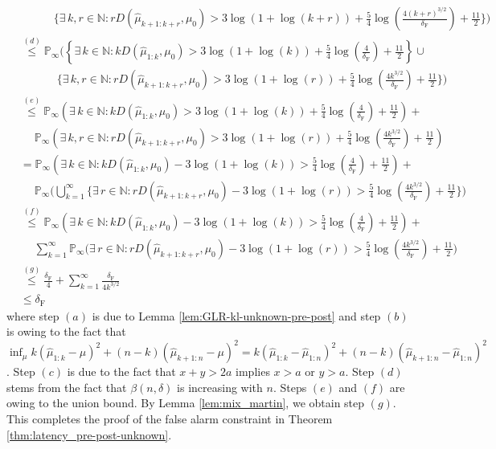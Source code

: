 \documentclass[12pt]{interact}
\newcommand{\lp}{\left(}
\newcommand{\rp}{\right)}
\newcommand{\mrm}{\mathrm}
\newcommand{\mbb}{\mathbb}
\renewcommand{\Pr}{\mathbb{P}}
\theoremstyle{plain}
\begin{document}
\begin{align}
    &\quad\quad\quad\Bigg\{\exists\,k,r\in\mathbb{N}:r D (\hat{\mu}_{k+1:k+r},\mu_{0})>3\log(1+\log(k+r))+\frac{5}{4}\log\lp\frac{4\lp k+r\rp^{3/2}}{\delta_{\mrm{F}}}\rp+\frac{11}{2}\Bigg\}\Bigg)\\\nonumber
    &\overset{(d)}{\leq}\Pr_{\infty}\bigg(\left\{\exists\,k\in\mathbb{N}:k D (\hat{\mu}_{1:k},\mu_{0})>3\log(1+\log(k))+\frac{5}{4}\log\lp\frac{4}{\delta_{\mrm{F}}}\rp+\frac{11}{2}\right\}\cup\\\nonumber
    &\quad\quad\quad\;\bigg\{\exists\,k,r\in\mathbb{N}:r D (\hat{\mu}_{k+1:k+r},\mu_{0})>3\log(1+\log(r))+\frac{5}{4}\log\lp\frac{4k^{3/2}}{\delta_{\mrm{F}}}\rp+\frac{11}{2}\bigg\}\bigg) \\\nonumber
    &\overset{(e)}{\leq}\Pr_{\infty}\left(\exists\,k\in\mathbb{N}:k D (\hat{\mu}_{1:k},\mu_{0})>3\log(1+\log(k))+\frac{5}{4}\log\lp\frac{4}{\delta_{\mrm{F}}}\rp+\frac{11}{2}\right)+\\\nonumber
    &\quad\;\Pr_{\infty}\left(\exists\,k,r\in\mathbb{N}:r D (\hat{\mu}_{k+1:k+r},\mu_{0})>3\log(1+\log(r))+\frac{5}{4}\log\lp\frac{4k^{3/2}}{\delta_{\mrm{F}}}\rp+\frac{11}{2}\right)\\\nonumber
    &=\Pr_{\infty}\left(\exists\,k\in\mathbb{N}:k D (\hat{\mu}_{1:k},\mu_{0})-3\log(1+\log(k))>\frac{5}{4}\log\lp\frac{4}{\delta_{\mrm{F}}}\rp+\frac{11}{2}\right)+\\\nonumber
    &\quad\;\Pr_{\infty}\bigg(\bigcup_{k=1}^{\infty}\bigg\{\exists\,r\in\mbb{N}:r D (\hat{\mu}_{k+1:k+r},\mu_{0})-3\log(1+\log(r))>\frac{5}{4}\log\lp\frac{4k^{3/2}}{\delta_{\mrm{F}}}\rp + \frac{11}{2}\bigg\}\bigg)\\\nonumber
    &\overset{(f)}{\leq}\Pr_{\infty}\left(\exists\,k\in\mathbb{N}:k D (\hat{\mu}_{1:k},\mu_{0})-3\log(1+\log(k))>\frac{5}{4}\log\lp\frac{4}{\delta_{\mrm{F}}}\rp+\frac{11}{2}\right)+\\\nonumber
    &\quad\;\sum_{k=1}^{\infty}\Pr_{\infty}\bigg(\exists\,r\in\mbb{N}:r D (\hat{\mu}_{k+1:k+r},\mu_{0})-3\log(1+\log(r))>\frac{5}{4}\log\lp\frac{4k^{3/2}}{\delta_{\mrm{F}}}\rp+\frac{11}{2}\bigg)\\\nonumber
    &\overset{(g)}{\leq}\frac{\delta_{\mrm{F}}}{4}+\sum_{k=1}^{\infty}\frac{\delta_{\mrm{F}}}{4k^{3/2}}\\
    &\leq\delta_{\mrm{F}}\label{eq:Prop_2_proof}
\end{align}
%
where step $(a)$ is due to Lemma \ref{lem:GLR-kl-unknown-pre-post} and step $(b)$ is owing to the fact that $\inf_{\mu} k \lp \hat{\mu}_{1:k} - \mu \rp^{2} + \lp n - k \rp \lp \hat{\mu}_{k + 1 : n} - \mu \rp^{2} = k \lp \hat{\mu}_{1:k} - \hat{\mu}_{1:n} \rp^{2} + \lp n - k \rp \lp \hat{\mu}_{k + 1 : n} - \hat{\mu}_{1:n} \rp^{2}$. Step $(c)$ is due to the fact that $x+y>2a$ implies $x>a$ or $y>a$. Step $(d)$ stems from the fact that $\beta\lp n,\delta\rp$ is increasing with $n$. Steps $(e)$ and $(f)$ are owing to the union bound. By Lemma \ref{lem:mix_martin}, we obtain step $(g)$. This completes the proof of the false alarm constraint in Theorem \ref{thm:latency_pre-post-unknown}.
\end{document}
